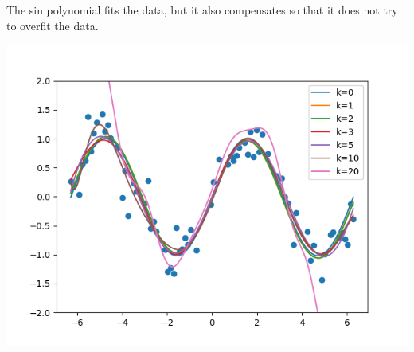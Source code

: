 \begin{answer}

The sin polynomial fits the data, but it also compensates so that it does not try to overfit the data.

\includegraphics{part_d.png}

\end{answer}
